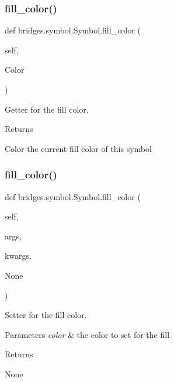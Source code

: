 \subsubsection{\texorpdfstring{fill\+\_\+color()}{fill\_color()}\hspace{0.1cm}{\footnotesize\ttfamily [1/2]}}
{\footnotesize\ttfamily def bridges.\+symbol.\+Symbol.\+fill\+\_\+color (\begin{DoxyParamCaption}\item[{}]{self,  }\item[{}]{Color }\end{DoxyParamCaption})}



Getter for the fill color. 

\begin{DoxyReturn}{Returns}


Color the current fill color of this symbol 
\end{DoxyReturn}
\mbox{\label{classbridges_1_1symbol_1_1_symbol_acec37468f0018db1416622062983eb46}} 
\subsubsection{\texorpdfstring{fill\+\_\+color()}{fill\_color()}\hspace{0.1cm}{\footnotesize\ttfamily [2/2]}}
{\footnotesize\ttfamily def bridges.\+symbol.\+Symbol.\+fill\+\_\+color (\begin{DoxyParamCaption}\item[{}]{self,  }\item[{}]{args,  }\item[{}]{kwargs,  }\item[{}]{None }\end{DoxyParamCaption})}



Setter for the fill color. 


\begin{DoxyParams}{Parameters}
{\em color} & the color to set for the fill \\
\hline
\end{DoxyParams}
\begin{DoxyReturn}{Returns}


None 
\end{DoxyReturn}
\mbox{\label{classbridges_1_1symbol_1_1_symbol_ae53057317f11148bbbf7c17c671cac2d}} 
